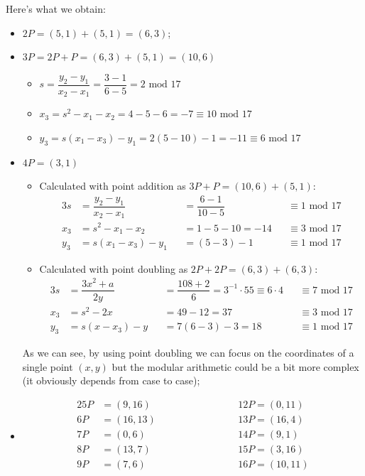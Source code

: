 \documentclass[11pt, a4paper]{article}
\newcommand{\mymod}{
    \text{ mod }
}
\begin{document}
\newpage
\hfill\break
Here's what we obtain:
\begin{itemize}
    \item $2P=(5,1)+(5,1)=(6,3)$;
    \item $3P=2P+P=(6,3)+(5,1)=(10,6)$
    \begin{itemize}
        \item[] $s=\dfrac{y_2-y_1}{x_2-x_1}=\dfrac{3-1}{6-5}=2\mymod 17$
        \item[] $x_3=s^2-x_1-x_2=4-5-6=-7\equiv10\mymod17$
        \item[] $y_3=s(x_1-x_3)-y_1=2(5-10)-1=-11\equiv6\mymod17$
    \end{itemize}
    \item $4P=(3,1)$
    \begin{itemize}
        \item Calculated with point addition as $3P+P=(10,6)+(5,1)$:
        \begin{alignat*}{3}
            s&=\dfrac{y_2-y_1}{x_2-x_1}&&=\dfrac{6-1}{10-5}&&\equiv1\mymod 17\\
            x_3&=s^2-x_1-x_2&&=1-5-10=-14&&\equiv3\mymod17\\
            y_3&=s(x_1-x_3)-y_1&&=(5-3)-1&&\equiv1\mymod17
        \end{alignat*}
        \item Calculated with point doubling as $2P+2P=(6,3)+(6,3)$:
        \begin{alignat*}{3}
            s&=\dfrac{3x^2+a}{2y}&&=\dfrac{108+2}{6}=3^{-1}\cdot55\equiv6\cdot4&&\equiv7\mymod 17\\
            x_3&=s^2-2x&&=49-12=37&&\equiv3\mymod17\\
            y_3&=s(x-x_3)-y&&=7(6-3)-3=18&&\equiv1\mymod17
        \end{alignat*}
    \end{itemize}
    As we can see, by using point doubling we can focus on the coordinates of a single point $(x,y)$ but the modular arithmetic could be a bit more complex (it obviously depends from case to case);
    \item \begin{alignat*}{2}
        5P&=(9,16)\hspace{3cm}&&12P=(0,11)\\
        6P&=(16,13)&&13P=(16,4)\\
        7P&=(0,6)&&14P=(9,1)\\
        8P&=(13,7)&&15P=(3,16)\\
        9P&=(7,6)&&16P=(10,11)\\

\end{alignat*}
\end{itemize}
\end{document}
